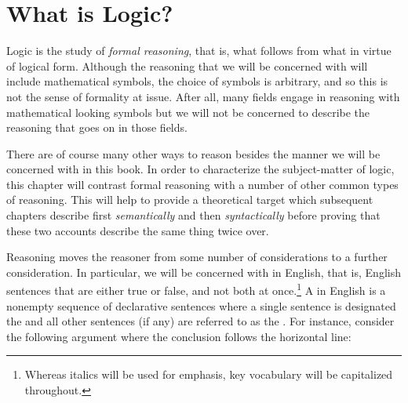 

\chapter{What is Logic?}
\label{ch.introduction}

Logic is the study of \textit{formal reasoning}, that is, what follows from what in virtue of logical form.
Although the reasoning that we will be concerned with will include mathematical symbols, the choice of symbols is arbitrary, and so this is not the sense of formality at issue.
After all, many fields engage in reasoning with mathematical looking symbols but we will not be concerned to describe the reasoning that goes on in those fields.

There are of course many other ways to reason besides the manner we will be concerned with in this book.
In order to characterize the subject-matter of logic, this chapter will contrast formal reasoning with a number of other common types of reasoning.
This will help to provide a theoretical target which subsequent chapters describe first \textit{semantically} and then \textit{syntactically} before proving that these two accounts describe the same thing twice over.

Reasoning moves the reasoner from some number of considerations to a further consideration.
In particular, we will be concerned with  in English, that is, English sentences that are either true or false, and not both at once.\footnote{Whereas italics will be used for emphasis, key vocabulary will be capitalized throughout.}
A  in English is a nonempty sequence of declarative sentences where a single sentence is designated the  and all other sentences (if any) are referred to as the .
For instance, consider the following argument where the conclusion follows the horizontal line:

\begin{earg}
\end{earg}

